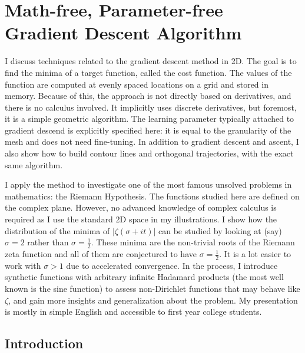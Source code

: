 \documentclass[oneside,10pt]{book}
\begin{document}
\chapter{Math-free, Parameter-free Gradient Descent Algorithm}{}\label{gentil}

I discuss techniques related to the gradient descent method in 2D. 
The goal is to find the minima of a target function, called the cost function. The values of the function are computed at evenly spaced locations on a grid and stored in memory. Because of this, the approach is not directly based on derivatives, and there is no calculus involved. It implicitly uses discrete derivatives, but foremost, it is a simple geometric algorithm. The learning parameter typically 
 attached to gradient descend is explicitly specified here: it is equal to the granularity of the mesh and does not need fine-tuning. In addition to gradient descent and ascent, I also show how to build contour lines and orthogonal trajectories, with the exact same algorithm.

I apply the method to investigate one of the most famous unsolved problems in mathematics: the Riemann Hypothesis. The functions studied here are defined on the complex plane. However, no advanced knowledge of complex calculus is required as I use the standard 2D space in my illustrations. I show how the distribution of the minima of $|\zeta(\sigma +it)|$ can be studied by looking at (say) $\sigma=2$ rather than $\sigma=\frac{1}{2}$. These minima are the non-trivial roots of the Riemann zeta function and all of them are conjectured to have $\sigma=\frac{1}{2}$. It is a lot easier to work with $\sigma>1$ due to
 accelerated convergence. In the process, I introduce synthetic functions with arbitrary infinite Hadamard products (the most well known is the sine function) to assess non-Dirichlet functions that may behave like $\zeta$, and gain more insights and generalization about the problem. My presentation is mostly in simple English and accessible to first year college students. 

\section{Introduction}
\end{document}
